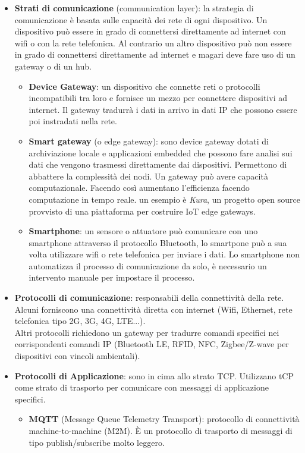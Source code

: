 \documentclass[a4paper]{article}
\theoremstyle{definition}
\begin{document}
\begin{itemize}
\begin{itemize}
				\end{itemize}
				\item \textbf{Strati di comunicazione} (communication layer): la strategia di comunicazione è basata sulle capacità dei rete di ogni dispositivo. Un dispositivo può essere in grado di connettersi direttamente ad internet con wifi o con la rete telefonica. Al contrario un altro dispositivo può non essere in grado di connettersi direttamente ad internet e magari deve fare uso di un gateway o di un hub.
				\begin{itemize}
					\item \textbf{Device Gateway}: un dispositivo che connette reti o protocolli incompatibili tra loro e fornisce un mezzo per connettere dispositivi ad internet. Il gateway tradurrà i dati in arrivo in dati IP che possono essere poi instradati nella rete.
					\item \textbf{Smart gateway} (o edge gateway): sono device gateway dotati di archiviazione locale e applicazioni embedded che possono fare analisi sui dati che vengono trasmessi direttamente dai dispositivi. Permettono di abbattere la complessità dei nodi. Un gateway può avere capacità computazionale. Facendo così aumentano l'efficienza facendo computazione in tempo reale. un esempio è \textit{Kura}, un progetto open source provvisto di una piattaforma per costruire IoT edge gateways.
					\item \textbf{Smartphone}: un sensore o attuatore può comunicare con uno smartphone attraverso il protocollo Bluetooth, lo smartpone può a sua volta utilizzare wifi o rete telefonica per inviare i dati. Lo smartphone non automatizza il processo di comunicazione da solo, è necessario un intervento manuale per impostare il processo.
				\end{itemize}
				\item \textbf{Protocolli di comunicazione}: responsabili della connettività della rete. Alcuni forniscono una connettività diretta con internet (Wifi, Ethernet, rete telefonica tipo 2G, 3G, 4G, LTE...). \\
				Altri protocolli richiedono un gateway per tradurre comandi specifici nei corrispondenti comandi IP (Bluetooth LE, RFID, NFC, Zigbee/Z-wave per dispositivi con vincoli ambientali).
				\item \textbf{Protocolli di Applicazione}: sono in cima allo strato TCP. Utilizzano tCP come strato di trasporto per comunicare con messaggi di applicazione specifici.
				\begin{itemize}
					\item \textbf{MQTT} (Message Queue Telemetry Transport): protocollo di connettività machine-to-machine (M2M). È un protocollo di trasporto di messaggi di tipo publish/subscribe molto leggero.\\

\end{itemize}
\end{itemize}
\end{document}
